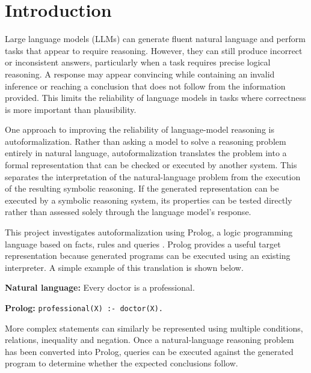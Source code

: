 \documentclass[11pt]{article} %
\theoremstyle{plain}
\theoremstyle{definition}
\begin{document}
\clearpage
\section{Introduction}

Large language models (LLMs) can generate fluent natural language and perform
tasks that appear to require reasoning. However, they can still produce
incorrect or inconsistent answers, particularly when a task requires precise
logical reasoning. A response may appear convincing while containing an invalid
inference or reaching a conclusion that does not follow from the information
provided. This limits the reliability of language models in tasks where
correctness is more important than plausibility.

One approach to improving the reliability of language-model reasoning is
autoformalization. Rather than asking a model to solve a reasoning problem
entirely in natural language, autoformalization translates the problem into a
formal representation that can be checked or executed by another system. This
separates the interpretation of the natural-language problem from the execution
of the resulting symbolic reasoning. If the generated representation can be
executed by a symbolic reasoning system, its properties can be tested directly
rather than assessed solely through the language model's response.

This project investigates autoformalization using Prolog, a logic programming
language based on facts, rules and queries \cite{wielemaker2012swiprolog}.
Prolog provides a useful target representation because generated programs can
be executed using an existing interpreter. A simple example of this translation
is shown below.

\begin{tcolorbox}
\textbf{Natural language:} Every doctor is a professional.

\medskip

\textbf{Prolog:} \texttt{professional(X) :- doctor(X).}
\end{tcolorbox}

More complex statements can similarly be represented using multiple conditions,
relations, inequality and negation. Once a natural-language reasoning problem
has been converted into Prolog, queries can be executed against the generated
program to determine whether the expected conclusions follow.
\end{document}
